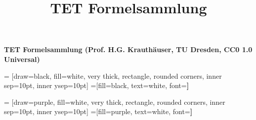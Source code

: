 \documentclass[fontsize=8pt]{scrartcl}
\title{TET Formelsammlung}
\begin{document}
\begin{center}{\huge{\textbf{TET Formelsammlung (Prof. H.G. Krauthäuser, TU Dresden, CC0 1.0 Universal)}}}\\
\end{center}
\begin{multicols*}{3}

 = [draw=black, fill=white, very thick,
    rectangle, rounded corners, inner sep=10pt, inner ysep=10pt]
 =[fill=black, text=white, font=\bfseries]

 = [draw=purple, fill=white, very thick,
    rectangle, rounded corners, inner sep=10pt, inner ysep=10pt]
 =[fill=purple, text=white, font=\bfseries]





\end{multicols*}
\end{document}
